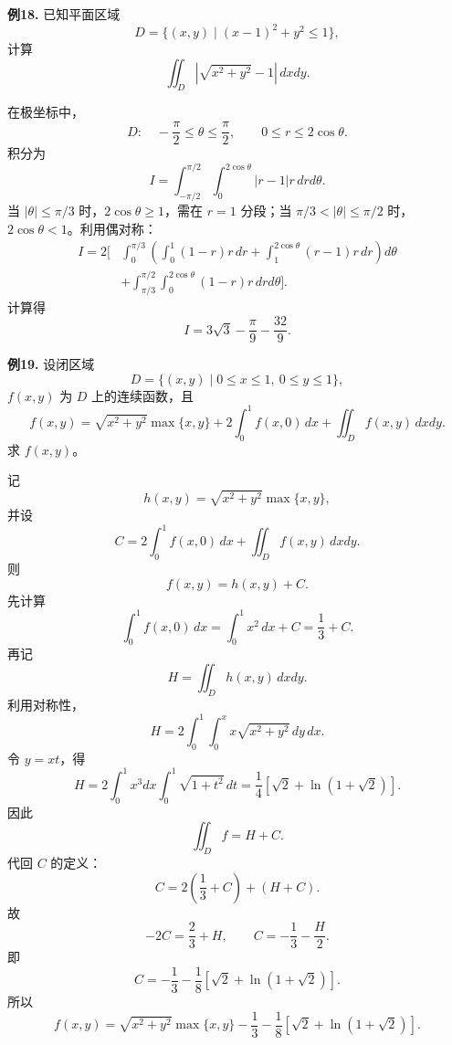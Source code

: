 \begin{problemblock}
\textbf{例18.} 已知平面区域
\[
D=\{(x,y)\mid (x-1)^2+y^2\le1\},
\]
计算
\[
\iint_D\left|\sqrt{x^2+y^2}-1\right|\,dxdy.
\]
\end{problemblock}
\begin{solutionblock}
在极坐标中，
\[
D:\quad -\frac\pi2\le\theta\le\frac\pi2,\qquad 0\le r\le2\cos\theta.
\]
积分为
\[
I=\int_{-\pi/2}^{\pi/2}\int_0^{2\cos\theta}|r-1|r\,drd\theta.
\]
当 \(|\theta|\le\pi/3\) 时，\(2\cos\theta\ge1\)，需在 \(r=1\) 分段；当 \(\pi/3<|\theta|\le\pi/2\) 时，\(2\cos\theta<1\)。利用偶对称：
\[
\begin{aligned}
I=2\bigg[&
\int_0^{\pi/3}\left(\int_0^1(1-r)r\,dr+\int_1^{2\cos\theta}(r-1)r\,dr\right)d\theta\\
&+\int_{\pi/3}^{\pi/2}\int_0^{2\cos\theta}(1-r)r\,drd\theta
\bigg].
\end{aligned}
\]
计算得
\[
I=3\sqrt3-\frac{\pi}{9}-\frac{32}{9}.
\]
\end{solutionblock}

\begin{problemblock}
\textbf{例19.} 设闭区域
\[
D=\{(x,y)\mid0\le x\le1,\ 0\le y\le1\},
\]
\(f(x,y)\) 为 \(D\) 上的连续函数，且
\[
f(x,y)=\sqrt{x^2+y^2}\max\{x,y\}
+2\int_0^1f(x,0)\,dx+\iint_Df(x,y)\,dxdy.
\]
求 \(f(x,y)\)。
\end{problemblock}
\begin{solutionblock}
记
\[
h(x,y)=\sqrt{x^2+y^2}\max\{x,y\},
\]
并设
\[
C=2\int_0^1f(x,0)\,dx+\iint_Df(x,y)\,dxdy.
\]
则
\[
f(x,y)=h(x,y)+C.
\]
先计算
\[
\int_0^1 f(x,0)\,dx
=\int_0^1 x^2\,dx+C=\frac13+C.
\]
再记
\[
H=\iint_D h(x,y)\,dxdy.
\]
利用对称性，
\[
H=2\int_0^1\int_0^x x\sqrt{x^2+y^2}\,dy\,dx.
\]
令 \(y=xt\)，得
\[
H=2\int_0^1x^3dx\int_0^1\sqrt{1+t^2}\,dt
=\frac14\left[\sqrt2+\ln(1+\sqrt2)\right].
\]
因此
\[
\iint_Df=H+C.
\]
代回 \(C\) 的定义：
\[
C=2\left(\frac13+C\right)+(H+C).
\]
故
\[
-2C=\frac23+H,
\qquad
C=-\frac13-\frac H2.
\]
即
\[
C=-\frac13-\frac18\left[\sqrt2+\ln(1+\sqrt2)\right].
\]
所以
\[
f(x,y)=\sqrt{x^2+y^2}\max\{x,y\}
-\frac13-\frac18\left[\sqrt2+\ln(1+\sqrt2)\right].
\]
\end{solutionblock}

